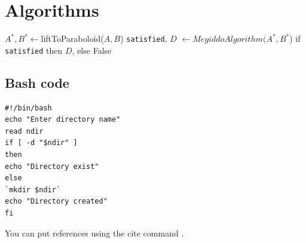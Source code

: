 \documentclass{article}
\begin{document}
\section{Algorithms}
\begin{algorithm}
\begin{algorithmic}[1]
    \State $A^*,B^*\leftarrow$liftToParaboloid($A,B$)
    \State \texttt{satisfied}, $D$ $\leftarrow MegiddoAlgorithm(A^*,B^*$) 
    \State if \texttt{satisfied} then \Return $D$, else \Return False
\EndProcedure
\end{algorithmic}
\end{algorithm}
\subsection{Bash code}
\begin{verbatim}
#!/bin/bash
echo "Enter directory name"
read ndir
if [ -d "$ndir" ]
then
echo "Directory exist"
else
`mkdir $ndir`
echo "Directory created"
fi
\end{verbatim}
You can put references  using the cite command \cite{linearProg}.


\printbibliography
\end{document}
